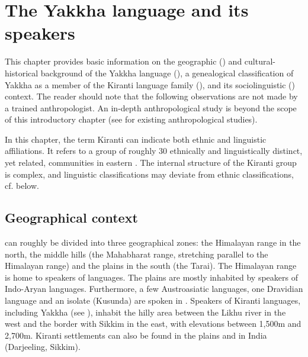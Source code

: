 \chapter{The Yakkha language and its speakers}\label{languageintro}
This chapter provides basic information on the geographic () and cultural-historical  background of the Yakkha language (), a genealogical classification of Yakkha as a member of the Kiranti language family (), and its sociolinguistic () context. The reader should note that the  following observations are not made by a trained anthropologist. An in-depth anthropological study is beyond the scope of this introductory chapter (see  for existing anthropological studies). 

In this chapter, the term  Kiranti can indicate both ethnic and linguistic affiliations. It refers to a group of roughly 30 ethnically and linguistically distinct, yet related, communities in eastern . The internal structure of the Kiranti group is complex, and linguistic classifications may deviate from ethnic classifications, cf.  below.

\section{Geographical context}\label{geogr}

 can roughly be divided into three geographical zones: the Himalayan range in the north, the middle hills (the Mahabharat range, stretching parallel to the Himalayan range) and the plains in the south (the Tarai). The Himalayan range is home to speakers of  languages. The plains are mostly inhabited by speakers of Indo-Aryan languages. Furthermore, a few Austroasiatic languages, one Dravidian language and an isolate (Kusunda) are spoken in . Speakers of Kiranti languages, including Yakkha (see ), inhabit the hilly area between the Likhu river in the west and the border with Sikkim in the east, with elevations between 1,500m and 2,700m. Kiranti  settlements can also be found in the plains and in India (Darjeeling, Sikkim). 


